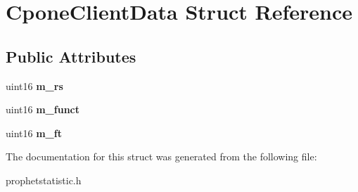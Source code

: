 \hypertarget{structCponeClientData}{
\section{CponeClientData Struct Reference}
\label{structCponeClientData}
}
\subsection*{Public Attributes}
\begin{DoxyCompactItemize}
\item 
\hypertarget{structCponeClientData_a8c00ff9b8dc855157e39c28153c63a3d}{
uint16 {\bfseries m\_\-rs}}
\label{structCponeClientData_a8c00ff9b8dc855157e39c28153c63a3d}

\item 
\hypertarget{structCponeClientData_a32ed256e83d863a90f15703ad5f1c939}{
uint16 {\bfseries m\_\-funct}}
\label{structCponeClientData_a32ed256e83d863a90f15703ad5f1c939}

\item 
\hypertarget{structCponeClientData_a0e766d5a2efdc208c2aca7187aa32af7}{
uint16 {\bfseries m\_\-ft}}
\label{structCponeClientData_a0e766d5a2efdc208c2aca7187aa32af7}

\end{DoxyCompactItemize}


The documentation for this struct was generated from the following file:\begin{DoxyCompactItemize}
\item 
prophetstatistic.h\end{DoxyCompactItemize}
